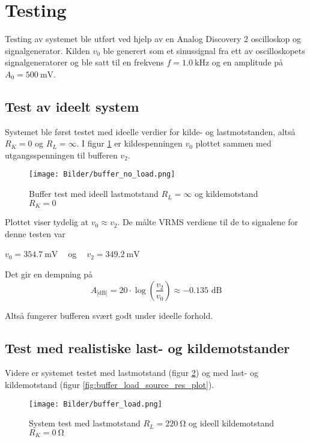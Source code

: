 \section{Testing}

Testing av systemet ble utført ved hjelp av en Analog Discovery 2 \cite{analog_discovery} oscilloskop og 
signalgenerator. Kilden $v_0$ ble generert som et sinussignal fra ett av oscilloskopets signalgeneratorer 
og ble satt til en frekvens $f = \SI{1.0}{\kilo\hertz}$ og en amplitude på $A_0 = \SI{500}{\milli\volt}$.

\subsection{Test av ideelt system}
Systemet ble først testet med ideelle verdier for kilde- og lastmotstanden, altså
$R_K = 0$ og $R_L = \infty$. I figur \ref{fig:buffer_no_load_plot} er kildespenningen 
$v_0$ plottet sammen med utgangsspenningen til bufferen $v_2$.

\begin{figure}[H]
    \centering 
    \texttt{[image: Bilder/buffer\_no\_load.png]}
    \caption{Buffer test med ideell lastmotstand $R_L = \infty$ og kildemotstand $R_K = 0$}
    \label{fig:buffer_no_load_plot}
\end{figure}

Plottet viser tydelig at $v_0 \approx v_2$. De målte VRMS verdiene til de to signalene for denne testen var 
\begin{center}
    $v_0 = \SI{354.7}{\milli\volt}\:\:\:\:$ og $\:\:\:\:v_2 = \SI{349.2}{\milli\volt}$ 
\end{center}

Det gir en dempning på
\[
    A_\text{[dB]} = 20 \cdot \log{\left(\frac{v_2}{v_0}\right)} \approx -0.135 \text{ dB}
\]

Altså fungerer bufferen svært godt under ideelle forhold.

\subsection{Test med realistiske last- og kildemotstander}
Videre er systemet testet med lastmotstand (figur \ref{fig:buffer_load_no_res_plot}) og med last- 
og kildemotstand (figur \ref{fig:buffer_load_source_res_plot}).

\begin{figure}[H]
    \centering 
    \texttt{[image: Bilder/buffer\_load.png]}
    \caption{System test med lastmotstand $R_L = \SI{220}{\ohm}$ og ideell kildemotstand $R_K = \SI{0}{\ohm}$}
    \label{fig:buffer_load_no_res_plot}
\end{figure}

